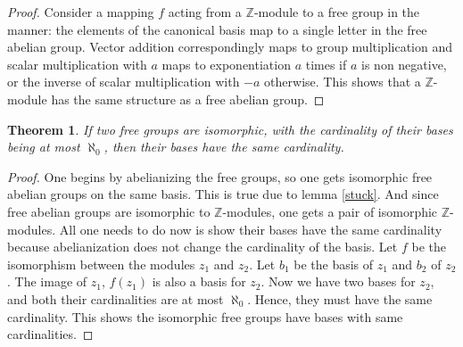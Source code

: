 \documentclass[12pt, titlepage]{article}
\newtheorem{thm}{Theorem}[section]
\theoremstyle{definition}
\begin{document}
\begin{proof}
Consider a mapping $f$ acting from a $\mathbb{Z}$-module to a free group in the manner: the elements of the canonical basis map to a single letter in the free abelian group. Vector addition correspondingly maps to group multiplication and scalar multiplication with $a$ maps to exponentiation $a$ times if $a$ is non negative, or the inverse of scalar multiplication with $-a$ otherwise. This shows that a $\mathbb{Z}$-module has the same structure as a free abelian group.
\end{proof}

\begin{thm}\label{conv}
If two free groups are isomorphic, with the cardinality of their bases being at most $\aleph_0$, then their bases have the same cardinality.
\end{thm}

\begin{proof}
One begins by abelianizing the free groups, so one gets isomorphic free abelian groups on the same basis. This is true due to lemma \autoref{stuck}. And since free abelian groups are isomorphic to $\mathbb{Z}$-modules, one gets a pair of isomorphic $\mathbb{Z}$-modules. All one needs to do now is show their bases have the same cardinality because abelianization does not change the cardinality of the basis. Let $f$ be the isomorphism between the modules $z_1$ and $z_2$. Let $b_1$ be the basis of $z_1$ and $b_2$ of $z_2$. The image of $z_1$, $f(z_1)$ is also a basis for $z_2$. Now we have two bases for $z_2$, and both their cardinalities are at most $\aleph_0$. Hence, they must have the same cardinality. This shows the isomorphic free groups have bases with same cardinalities.
\end{proof}
\end{document}
